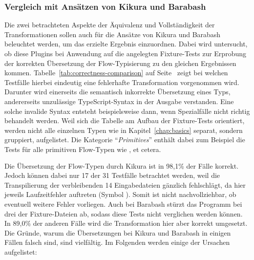 \subsubsection{Vergleich mit Ansätzen von Kikura und Barabash}

Die zwei betrachteten Aspekte der Äquivalenz und Vollständigkeit der Transformationen sollen auch für die Ansätze von Kikura und Barabash beleuchtet werden, um das erzielte Ergebnis einzuordnen. Dabei wird untersucht, ob diese Plugins bei Anwendung auf die angelegten Fixture-Tests zur Erprobung der korrekten Übersetzung der Flow-Typisierung zu den gleichen Ergebnissen kommen.
Tabelle~\ref{tab:correctness-comparison} auf Seite~\pageref{tab:correctness-comparison} zeigt bei welchen Testfälle hierbei eindeutig eine fehlerhafte Transformation vorgenommen wird. Darunter wird einerseits die semantisch inkorrekte Übersetzung eines Typs, andererseits unzulässige TypeScript-Syntax in der Ausgabe verstanden. Eine solche invalide Syntax entsteht beispielsweise dann, wenn Spezialfälle nicht richtig behandelt werden. Weil sich die Tabelle am Aufbau der Fixture-Tests orientiert, werden nicht alle einzelnen Typen wie in Kapitel~\ref{chap:basics} separat, sondern gruppiert, aufgelistet. Die Kategorie \enquote{\textit{Primitives}} enthält dabei zum Beispiel die Tests für alle primitiven Flow-Typen wie ,  et cetera.

\medbreak


Die Übersetzung der Flow-Typen durch Kikura ist in 98,1\% der Fälle korrekt. Jedoch können dabei nur 17 der 31 Testfälle betrachtet werden, weil die Transpilierung der verbleibenden 14 Eingabedateien gänzlich fehlschlägt, da hier jeweils Laufzeitfehler auftreten (Symbol \Lightning). Somit ist nicht nachvollziehbar, ob eventuell weitere Fehler vorliegen. Auch bei Barabash stürzt das Programm bei drei der Fixture-Dateien ab, sodass diese Tests nicht verglichen werden können. In 89,0\% der anderen Fälle wird die Transformation hier aber korrekt umgesetzt. Die Gründe, warum die Übersetzungen bei Kikura und Barabash in einigen Fällen falsch sind, sind vielfältig. Im Folgenden werden einige der Ursachen aufgelistet:


